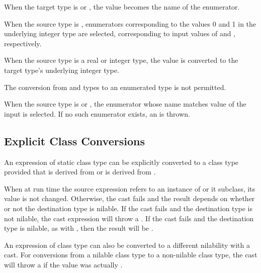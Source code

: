 When the target type is  or , the value becomes the
name of the enumerator.

When the source type is , enumerators corresponding to the values 0
and 1 in the underlying integer type are selected, corresponding to input values
of  and , respectively.


When the source type is a real or integer type, the value is converted to the
target type's underlying integer type.

The conversion from  and  types to an enumerated type is not
permitted.

When the source type is  or , the enumerator whose name
matches value of the input is selected.  If no such enumerator exists, an
 is thrown.

\subsection{Explicit Class Conversions}
\label{Explicit_Class_Conversions}

An expression of static class type  can be explicitly
converted to a class type  provided that  is derived
from  or  is derived from .

When at run time the source expression refers to an instance of 
or it subclass, its value is not changed.  Otherwise, the cast fails and
the result depends on whether or not the destination type is nilable. If
the cast fails and the destination type is not nilable, the cast
expression will throw a . If the cast fails and the
destination type is nilable, as with , then the result will be
.

An expression of class type can also be converted to a different
nilability with a cast. For conversions from a nilable class type to a
non-nilable class type, the cast will throw a  if the
value was actually .


